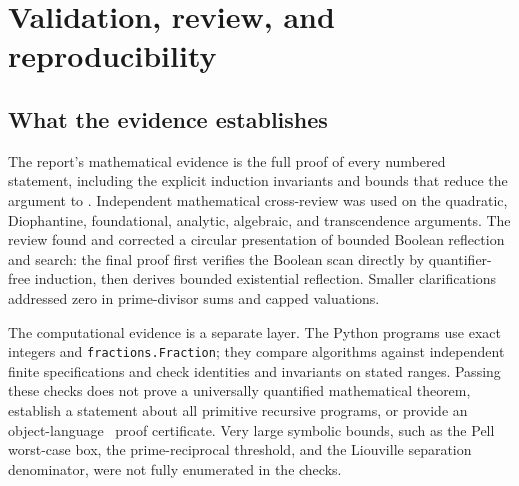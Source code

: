 \section{Validation, review, and reproducibility}
\label{sec:validation}

\subsection{What the evidence establishes}
The report's mathematical evidence is the full proof of every numbered statement, including the explicit induction invariants and bounds that reduce the argument to \ipra. Independent mathematical cross-review was used on the quadratic, Diophantine, foundational, analytic, algebraic, and transcendence arguments. The review found and corrected a circular presentation of bounded Boolean reflection and search: the final proof first verifies the Boolean scan directly by quantifier-free induction, then derives bounded existential reflection. Smaller clarifications addressed zero in prime-divisor sums and capped valuations.

The computational evidence is a separate layer. The Python programs use exact integers and \texttt{fractions.Fraction}; they compare algorithms against independent finite specifications and check identities and invariants on stated ranges. Passing these checks does not prove a universally quantified mathematical theorem, establish a statement about all primitive recursive programs, or provide an object-language \ipra\ proof certificate. Very large symbolic bounds, such as the Pell worst-case box, the prime-reciprocal threshold, and the Liouville separation denominator, were not fully enumerated in the checks.


